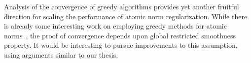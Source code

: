 Analysis of the convergence of greedy algorithms provides yet another fruitful
direction for scaling the performance of atomic norm regularization. While there
is already some interesting work on employing greedy methods for atomic
norms~\cite{tewari2011greedy,raogreedy}, the proof of convergence depends upon
global restricted smoothness property. It would be interesting to pursue
improvements to this assumption, using arguments similar to our thesis.

% 
% 




